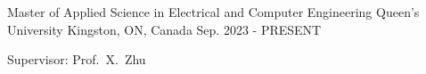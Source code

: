 

\begin{cventries}

  \cventry
    {Master of Applied Science in Electrical and Computer Engineering} %
    {Queen's University} %
    {Kingston, ON, Canada} %
    {Sep. 2023 - PRESENT} %
    {
      \begin{cvitems}
        \item{
          Supervisor: Prof.~X.~Zhu
        }
      \end{cvitems}
    }


\end{cventries}
